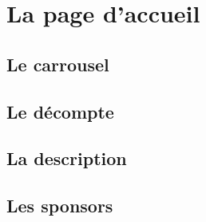 \section{La page d'accueil}

\subsection{Le carrousel}

\subsection{Le décompte}

\subsection{La description}

\subsection{Les sponsors}
